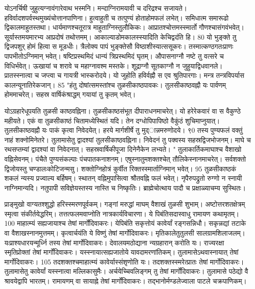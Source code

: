 योऽनर्चिषी जुहुत्यग्नावंगारेवाथ भस्मनि।
 मन्दाग्निरामयावी च दरिद्रश्च सजायते।
 हविर्वादशपर्वस्थमुख्यंचोत्तानपाणिना।
 हुत्वाहुती च तत्पुण्यं होताहोमफलं लभेत्।
 समिधात्म समारूढो द्विकालमाहुतस्तथा।
 धार्यमाणश्चतूरात्र माहुताग्निस्तुलौकिकः।
 आप्रातश्चोत्तमस्स्मार्तो गौणश्चासंगवंभवेत्।
 सूर्यास्तमयमारभ्य आप्रदोषं तथोत्तमम्।
 आकाल्याडोमकालस्स्यादिति केचिद्वदंति हि।
 80 यो भुङ्क्ते तु द्विजपशुर् होमं हित्वा स मूडधीः।
 त्रैलोक्य पापं भुङ्क्तेसौ विष्ठाशीस्यात्ससूकरः।
 तस्मात्कण्ठगतःप्राणः पापभीतोऽग्निमान् भवेत्।
 षष्टिप्रस्थमिदं धान्यं त्रिप्रस्थमिदं घृतम्।
 औपासनाग्नौ नष्टे तु वत्सरे च विधिर्भवेत्।
 ऊखायां च शरावे च महाग्नावश्म मस्तके।
 शूद्राग्नौ सूतकाग्नौ न जुहुयाद्विधवानले।
 प्रातस्स्नात्वा च जप्त्वा च गायत्री भास्करोदये।
 यो जुहोति हविर्वह्नौ स एव श्रुतिपारगाः।
 मन्त्र तन्त्रविपर्यास कालन्यूनातिरेकजान्।
 85 "हंतु दोषांत्समस्तांश्च तुळसीकाष्ठपावकः।
 तुलसीकाष्ठवह्नौ यः पार्वणम् होममाचरेत्।
 सहस्र वार्षिकंश्राद्धम् गयायां तु कृतम् भवेत्।
 
योऽग्रहारेधूपयति तुळसी काष्ठवह्निना।
 तुळसीकाष्ठसंभूत दीपाराधनमाचरेत्।
 यो हरेरेकवारं वा स वैकुण्ठे महीयते।
 एकं वा तुळसीकाष्ठं चितामध्येस्थितं यदि।
 तेन दग्धोपिपापिष्ठो वैकुंठं शुचिमाप्नुयात्।
 तुलसीकाष्ठवह्नौ यः पाकं कृत्वा निवेदयेत्।
 हरये मार्गशीर्षे तु मुद्ान्नमरुणोदये।
 ९0 तस्य पुण्यफलं वक्तुं नाहं शक्नोमिनेतरे।
 तुलामासेतु द्वादश्यां तुलसीकाष्ठवह्निना।
 निवेदनं तु पक्वस्य सहस्रद्विजभोजनम्।
 माघे च रथसप्तम्यां द्वादश्यां वा निवेदनात्।
 सहस्रवार्षिकीपूजा दिनेनैकेन लभ्यते।
 " तुलाकार्तिकमाघाश्च वैशाखो वह्निसेवनम्।
 पंचैते पुण्यसंकल्पाः पंचपातकनाशनम्।
 एषुस्नातुमशक्तश्चेत् तौलिकेस्नानमाचरेत्।
 सर्वशक्तो द्विजोयस्तु चण्डालःकोटिजन्मसु।
 शक्तोग्निहोत्रं कुर्वीत रिक्तस्स्मार्ताग्निमान् भवेत्।
 95 तुळसीकाष्ठकं शकलं न्यस्य प्रज्वाल्य बर्हिषम्।
 स्थातन् वह्निमुपासित्वा श्रौतवह्नि फलं भवेत्।
 नृपैरुपद्रुतो रुग्णो न स्नायी नाग्निमान्यदि।
 नतुपापी सविज्ञेयस्तस्य नास्ति च निष्कृतिः।
 ब्राह्मेचोत्थाय पादौ च प्रक्षाळ्याचम्य सुस्थितः।
 
प्राङ्मुखो वाग्यतश्शुद्धो हरिस्स्मरणपूर्वकम्।
 गङ्गां मरुद्धां माघम् वैशाखं तुळसी शुभाम्।
 अष्टोत्तरशतक्षेत्रम् स्मृत्वा संकीर्तयेद्धरिम्।
 तत्तत्फलमवाप्नोति नात्रकार्यविचारणा।
 ये पिबंतिसदास्वाधु रामायण कथामृतम्।
 100 माहात्म्यं सह्यजायाश्च तेषां मार्गोंदिवाकरः।
 येपिबंति सकृत्तोयं कावेर्यां रङ्गसन्निधौ।
 सकृन्नद्यां तटाके वा वैशाखस्नानमुत्तमम्।
 कृत्वार्चयंति ये विष्णुं तेषां मार्गोदिवाकरः।
 मृतिकालेतुतुलसी सालग्रामशिलाजलम्।
 यःप्राश्यधारयन्मूर्ध्नि तस्य तेषां मार्गोदिवाकरः।
 देवालयमठोद्याना न्यग्रहारान् करोति यः।
 राज्यरक्षा स्मृतिप्रोक्तां तेषां मार्गोंदिवाकरः।
 यस्स्नायात्सह्यजातोये यावदामरणांतिकम्।
 तुलामासेऽथवास्नायात् तेषां मार्गोदिवाकरः।
 105 तदशक्तश्चमाहात्म्यं कावेर्यास्संशृणोति यः।
 तदशक्तस्स्मरेत्प्रातः तेषां मार्गोदिवाकरः।
 तुलामासेतु कावेर्यां यस्स्नात्वा मल्लिकासुमैः।
 अर्चयेच्चिवलिङ्गम् तु तेषां मार्गोंदिवाकरः।
 तुलामासे पठेद्यो वै श्रावयेद्वापि भारतम्।
 रामायणम् वा सायाह्ने तेषां मार्गोंदिवाकरः।
 तद्भानोर्मण्डलेज्वाला पाटले चक्रपाणिकम्।
 
